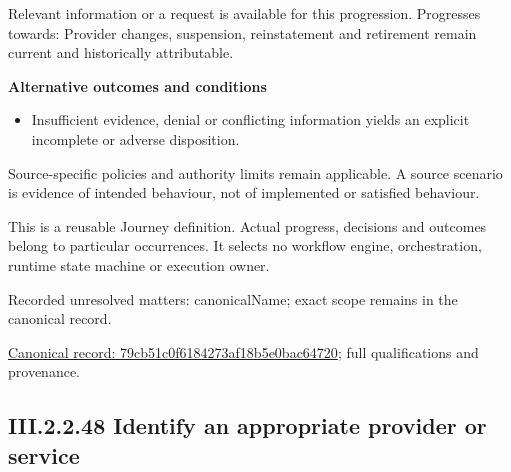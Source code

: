 Relevant information or a request is available for this progression. Progresses towards: Provider changes, suspension, reinstatement and retirement remain current and historically attributable.



\par\medskip\textbf{Alternative outcomes and conditions}\par


\begin{itemize}


\item Insufficient evidence, denial or conflicting information yields an explicit incomplete or adverse disposition.

\end{itemize}


Source-specific policies and authority limits remain applicable. A source scenario is evidence of intended behaviour, not of implemented or satisfied behaviour.



This is a reusable Journey definition. Actual progress, decisions and outcomes belong to particular occurrences. It selects no workflow engine, orchestration, runtime state machine or execution owner.


{\small Recorded unresolved matters: canonicalName; exact scope remains in the canonical record.}\par
{\footnotesize \href{../../../../continuum/strategy/value-stream/79cb51c0f6184273af18b5e0bac64720.md}{Canonical record: 79cb51c0f6184273af18b5e0bac64720}; full qualifications and provenance.}\par
\subsection*{III.2.2.48 Identify an appropriate provider or service}
\label{navigation:III.2.2.48}

